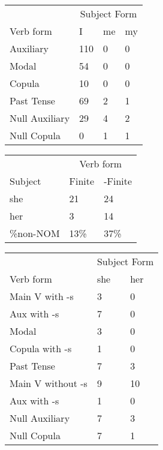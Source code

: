\begin{table}[!]
\begin{minipage}[t]{0.5\textwidth}
    \centering
    \begin{tabular}{@{}llll@{}}
        \toprule
            &\multicolumn{3}{c}{Subject Form}\\
            \cline{2-4}
        Verb form & I & me & my \\
        \midrule
        Auxiliary & 110 & 0 & 0 \\
        Modal & 54 & 0 & 0 \\
        Copula & 10 & 0 & 0 \\
        Past Tense & 69 & 2 & 1 \\
        \hline
        Null Auxiliary & 29 & 4 & 2 \\
        Null Copula & 0 & 1 & 1 \\
        \bottomrule
    \end{tabular}
\end{minipage}
\textbf{\linebreak}
\begin{minipage}[t]{0.5\textwidth}
    \centering
    \begin{tabular}{@{}lll@{}}
        \toprule
         & \multicolumn{2}{c}{Verb form}\\
         \cline{2-3}
        Subject & Finite & -Finite \\
        \midrule
        she & 21 & 24 \\
        her & 3 & 14 \\
        \hline
        \%non-NOM & 13\% & 37\% \\
    \bottomrule
    \end{tabular}
    \end{minipage}
\begin{minipage}[t]{0.5\textwidth}
    \centering
    \begin{tabular}{@{}lll@{}}
        \toprule
            &\multicolumn{2}{c}{Subject Form}\\
            \cline{2-3}
        Verb form & she & her \\
        \midrule
        Main V with -s & 3 & 0 \\
        Aux with -s & 7 & 0 \\
        Modal & 3 & 0 \\
        Copula with -s & 1 & 0 \\
        Past Tense & 7 & 3 \\
        \hline
        Main V without -s & 9 & 10  \\
        Aux with -s & 1 & 0  \\
        Null Auxiliary & 7 & 3 \\
        Null Copula & 7 & 1  \\
        \bottomrule
    \end{tabular}
\end{minipage}
\end{table}

